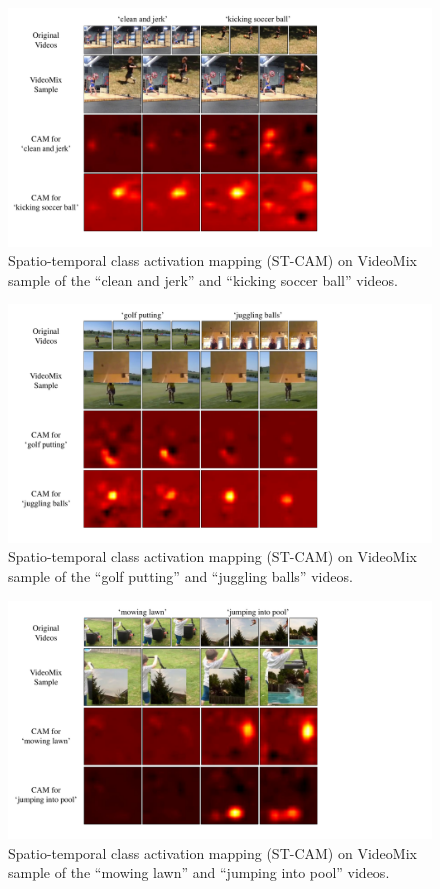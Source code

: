 \begin{figure}[!t]
\centering
\includegraphics[width=0.77\linewidth]{arxiv_videomix/supplementary/figs/cam_supp1.pdf}
\caption{Spatio-temporal class activation mapping (ST-CAM) on VideoMix sample of the ``clean and jerk'' and ``kicking soccer ball'' videos.}
\label{supp:cam1}
\end{figure}
\begin{figure}[!t]
\centering
\includegraphics[width=0.77\linewidth]{arxiv_videomix/supplementary/figs/cam_supp2.pdf}
\caption{Spatio-temporal class activation mapping (ST-CAM) on VideoMix sample of the ``golf putting'' and ``juggling balls'' videos.}
\label{supp:cam2}
\end{figure}
\begin{figure}[!t]
\centering
\includegraphics[width=0.77\linewidth]{arxiv_videomix/supplementary/figs/cam_supp3.pdf}
\caption{Spatio-temporal class activation mapping (ST-CAM) on VideoMix sample of the ``mowing lawn'' and ``jumping into pool'' videos.}
\label{supp:cam3}
\end{figure}
